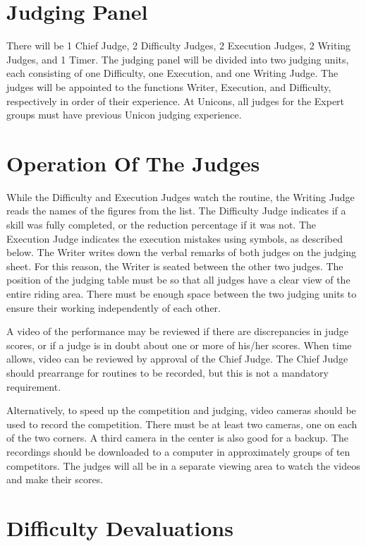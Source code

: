 \section{Judging Panel \label{sec:freestyle_std-judging-panel}}
There will be 1 Chief Judge, 2 Difficulty Judges, 2 Execution Judges, 2 Writing Judges, and 1 Timer.
The judging panel will be divided into two judging units, each consisting of one Difficulty, one Execution, and one Writing Judge.
The judges will be appointed to the functions Writer, Execution, and Difficulty, respectively in order of their experience.
At Unicons, all judges for the Expert groups must have previous Unicon judging experience.

\section{Operation Of The Judges}
While the Difficulty and Execution Judges watch the routine, the Writing Judge reads the names of the figures from the list.
The Difficulty Judge indicates if a skill was fully completed, or the reduction percentage if it was not.
The Execution Judge indicates the execution mistakes using symbols, as described below.
The Writer writes down the verbal remarks of both judges on the judging sheet.
For this reason, the Writer is seated between the other two judges.
The position of the judging table must be so that all judges have a clear view of the entire riding area.
There must be enough space between the two judging units to ensure their working independently of each other.

A video of the performance may be reviewed if there are discrepancies in judge scores, or if a judge is in doubt about one or more of his/her scores.
When time allows, video can be reviewed by approval of the Chief Judge.
The Chief Judge should prearrange for routines to be recorded, but this is not a mandatory requirement.

Alternatively, to speed up the competition and judging, video cameras should be used to record the competition.
There must be at least two cameras, one on each of the two corners.
A third camera in the center is also good for a backup.
The recordings should be downloaded to a computer in approximately groups of ten competitors.
The judges will all be in a separate viewing area to watch the videos and make their scores.

\section{Difficulty Devaluations}

